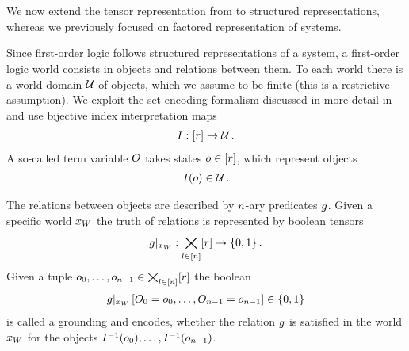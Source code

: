 \chapter{\chatextfolModels}\label{cha:folModels}

We now extend the tensor representation from to structured representations, whereas we previously focused on factored representation of systems.





%

Since first-order logic follows structured representations of a system, a first-order logic world consists in objects and relations between them.
To each world there is a world domain $\mathcal{U}$ of objects, which we assume to be finite (this is a restrictive assumption).
We exploit the set-encoding formalism discussed in more detail in  and use bijective index interpretation maps
\begin{align*}
    I : [r] \rightarrow \mathcal{U} \, .
\end{align*}
A so-called term variable $O$ takes states $o\in[r]$, which represent objects
\begin{align*}
    I(o) \in \mathcal{U} \, .
\end{align*}

%
The relations between objects are described by $n$-ary predicates $g$.
Given a specific world $x_{W}$ the truth of relations is represented by boolean tensors
\begin{align*}
    {g}|_{x_{W}} : \bigtimes_{l\in[n]}[r]\rightarrow\{0,1\} \, .
\end{align*}
Given a tuple $o_{0},\ldots,o_{n-1}\in\bigtimes_{l\in[n]}[r]$ the boolean
\begin{align*}
    {g}|_{x_{W}} \left[O_{0}=o_{0},\ldots,O_{n-1}=o_{n-1}\right] \in\{0,1\}
\end{align*}
is called a grounding and encodes, whether the relation $g$ is satisfied in the world $x_{W}$ for the objects $I^{-1}(o_{0}),\ldots,I^{-1}(o_{n-1})$.

